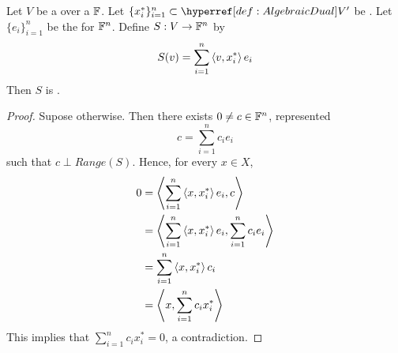 \begin{prop}[\LinearlyIndependent \LinearFunctionals]
    \label{prop:LinearlyIndependentLinearFunctionals}
        Let $V$ be a \VectorSpace
        over a \Field $\mathbb{F}$.
        Let $\{x_i^*\}_{i=1}^n \subset \scAlgebraicDual{V}$ be 
        \LinearlyIndependent. 
        Let $\{e_i\}_{i=1}^n$ be the \StandardBasis for $\mathbb{F}^n$. 
        Define $S:V \to  \mathbb{F}^n$ by 
        \begin{equation}
        S(v)= \sum\limits_{i=1}^n \left\langle v, x_i^* \right\rangle e_i
        \end{equation}
        Then $S$ is \Surjective. 
        \begin{proof}
            Supose otherwise.
            Then there exists $0 \neq c \in \mathbb{F}^n$, represented
            \begin{equation*}
            c= \sum\limits_{i=1}^n c_i e_i
            \end{equation*}
            such that $c \perp Range(S)$. Hence, for every $x \in X$, 
            \begin{align*}
            0 
            & = \left\langle \sum\limits_{i=1}^n \left\langle x, x_i^* \right\rangle e_i, c \right\rangle \\
            & =  \left\langle \sum\limits_{i=1}^n \left\langle x, x_i^* \right\rangle e_i, \sum\limits_{i=1}^n c_i e_i \right\rangle \\
            & = \sum\limits_{i=1}^n \left\langle x, x_i^* \right\rangle c_i\\
            & = \left\langle x, \sum\limits_{i=1}^n c_i x_i^* \right\rangle 
            \end{align*}
            This implies that $\sum\limits_{i=1}^n c_i x_i^* = 0$, a contradiction. 
        \end{proof}
\end{prop}
